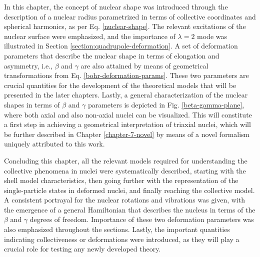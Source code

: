 
In this chapter, the concept of nuclear shape was introduced through the description of a nuclear radius parametrized in terms of collective coordinates and spherical harmonics, as per Eq. \ref{nuclear-shape}. The relevant excitations of the nuclear surface were emphasized, and the importance of $\lambda=2$ mode was illustrated in Section \ref{section:quadrupole-deformation}. A set of deformation parameters that describe the nuclear shape in terms of elongation and asymmetry, i.e., $\beta$ and $\gamma$ are also attained by means of geometrical transformations from Eq. \ref{bohr-deformation-params}. These two parameters are crucial quantities for the development of the theoretical models that will be presented in the later chapters. Lastly, a general characterization of the nuclear shapes in terms of $\beta$ and $\gamma$ parameters is depicted in Fig. \ref{beta-gamma-plane}, where both axial and also non-axial nuclei can be visualized. This will constitute a first step in achieving a geometrical interpretation of triaxial nuclei, which will be further described in Chapter \ref{chapter-7-novel} by means of a novel formalism uniquely attributed to this work.


Concluding this chapter, all the relevant models required for understanding the collective phenomena in nuclei were systematically described, starting with the shell model characteristics, then going further with the representation of the single-particle states in deformed nuclei, and finally reaching the collective model. A consistent portrayal for the nuclear rotations and vibrations was given, with the emergence of a general Hamiltonian that describes the nucleus in terms of the $\beta$ and $\gamma$ degrees of freedom. Importance of these two deformation parameters was also emphasized throughout the sections. Lastly, the important quantities indicating collectiveness or deformations were introduced, as they will play a crucial role for testing any newly developed theory.